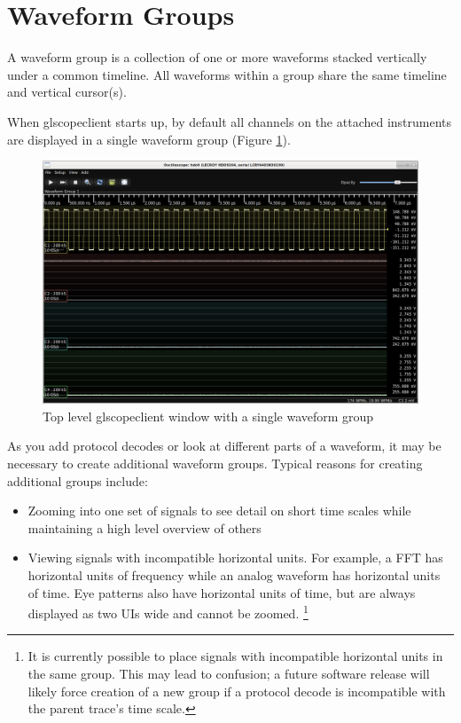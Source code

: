 \section{Waveform Groups}

A waveform group is a collection of one or more waveforms stacked vertically under a common timeline. All waveforms
within a group share the same timeline and vertical cursor(s).

When glscopeclient starts up, by default all channels on the attached instruments are displayed in a single waveform
group (Figure \ref{single-group}).

\begin{figure}[h]
\centering
\includegraphics[width=13cm]{images/overview.png}
\caption{Top level glscopeclient window with a single waveform group}
\label{single-group}
\end{figure}

As you add protocol decodes or look at different parts of a waveform, it may be necessary to create additional waveform
groups. Typical reasons for creating additional groups include:

\begin{itemize}
\item Zooming into one set of signals to see detail on short time scales while maintaining a high level overview of
others
\item Viewing signals with incompatible horizontal units. For example, a FFT has horizontal units of frequency while an
analog waveform has horizontal units of time. Eye patterns also have horizontal units of time, but are always displayed
as two UIs wide and cannot be zoomed.
\footnote
{
It is currently possible to place signals with incompatible horizontal units in the same group. This may lead to
confusion; a future software release will likely force creation of a new group if a protocol decode is incompatible
with the parent trace's time scale.
}
\end{itemize}


